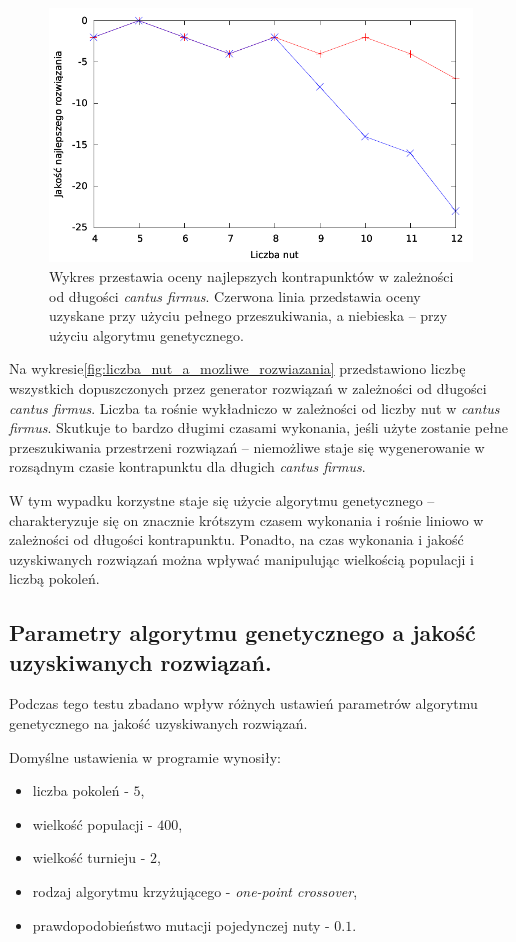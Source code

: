 \documentclass{article}
\begin{document}
\begin{figure}[htb]
\centering
\includegraphics[width=1.0\textwidth]{images/liczba_nut_a_jakosc.pdf}
\caption{Wykres przestawia oceny najlepszych kontrapunktów w zależności od długości \emph{cantus firmus}. Czerwona linia przedstawia oceny uzyskane przy użyciu pełnego przeszukiwania, a niebieska -- przy użyciu algorytmu genetycznego.}
\label{fig:liczba_nut_a_jakosc}
\end{figure}

Na wykresie\ref{fig:liczba_nut_a_mozliwe_rozwiazania} przedstawiono liczbę wszystkich dopuszczonych przez generator rozwiązań w zależności od długości \emph{cantus firmus}. Liczba ta rośnie wykładniczo w zależności od liczby nut w \emph{cantus firmus}. Skutkuje to bardzo długimi czasami wykonania, jeśli użyte zostanie pełne przeszukiwania przestrzeni rozwiązań -- niemożliwe staje się wygenerowanie w rozsądnym czasie kontrapunktu dla długich \emph{cantus firmus}.

W tym wypadku korzystne staje się użycie algorytmu genetycznego -- charakteryzuje się on znacznie krótszym czasem wykonania i rośnie liniowo w zależności od długości kontrapunktu. Ponadto, na czas wykonania i jakość uzyskiwanych rozwiązań można wpływać manipulując wielkością populacji i liczbą pokoleń.

\clearpage
\subsection{Parametry algorytmu genetycznego a jakość uzyskiwanych rozwiązań.}

Podczas tego testu zbadano wpływ różnych ustawień parametrów algorytmu genetycznego na jakość uzyskiwanych rozwiązań.

Domyślne ustawienia w programie wynosiły:
\begin{itemize}
\item liczba pokoleń - $5$,
\item wielkość populacji - $400$,
\item wielkość turnieju - $2$,
\item rodzaj algorytmu krzyżującego - \emph{one-point crossover},
\item prawdopodobieństwo mutacji pojedynczej nuty - $0.1$.
\end{itemize}
\end{document}

